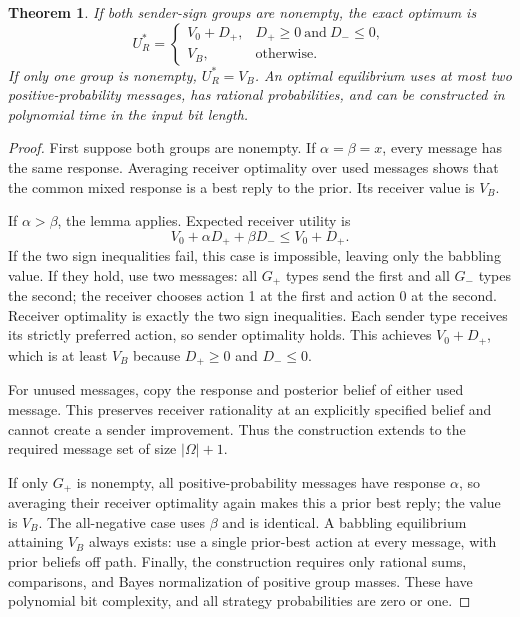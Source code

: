 \documentclass[11pt]{article}
\newtheorem{theorem}{Theorem}
\theoremstyle{definition}
\begin{document}
\begin{theorem}
If both sender-sign groups are nonempty, the exact optimum is
\[
 U_R^*=\begin{cases}
 V_0+D_+,&D_+\ge0\ \text{and}\ D_-\le0,\\
 V_B,&\text{otherwise}.
 \end{cases}                                               \tag{1}
\]
If only one group is nonempty, $U_R^*=V_B$.
An optimal equilibrium uses at most two positive-probability messages,
has rational probabilities, and can be constructed in polynomial time
in the input bit length.
\end{theorem}
\begin{proof}
First suppose both groups are nonempty. If $\alpha=\beta=x$, every
message has the same response. Averaging receiver optimality over used
messages shows that the common mixed response is a best reply to the
prior. Its receiver value is $V_B$.

If $\alpha>\beta$, the lemma applies. Expected receiver utility is
\[
 V_0+\alpha D_++\beta D_-\le V_0+D_+.                    \tag{2}
\]
If the two sign inequalities fail, this case is impossible, leaving only
the babbling value. If they hold, use two messages: all $G_+$ types send
the first and all $G_-$ types the second; the receiver chooses action 1
at the first and action 0 at the second. Receiver optimality is exactly
the two sign inequalities. Each sender type receives its strictly
preferred action, so sender optimality holds. This achieves $V_0+D_+$,
which is at least $V_B$ because $D_+\ge0$ and $D_-\le0$.

For unused messages, copy the response and posterior belief of either
used message. This preserves receiver rationality at an explicitly
specified belief and cannot create a sender improvement. Thus the
construction extends to the required message set of size $|\Omega|+1$.

If only $G_+$ is nonempty, all positive-probability messages have response
$\alpha$, so averaging their receiver optimality again makes this a
prior best reply; the value is $V_B$. The all-negative case uses $\beta$
and is identical. A babbling equilibrium attaining $V_B$ always exists:
use a single prior-best action at every message, with prior beliefs off
path. Finally, the construction requires only rational sums, comparisons,
and Bayes normalization of positive group masses. These have polynomial
bit complexity, and all strategy probabilities are zero or one.
\end{proof}
\end{document}
